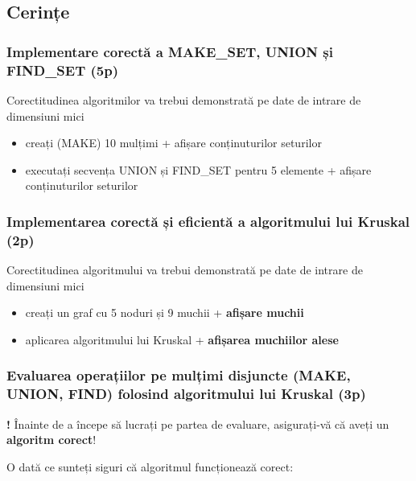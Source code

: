 \documentclass[../ro-fa-lab.tex]{subfiles}
\begin{document}
\subsection{Cerințe}\label{cerinux21be}

\subsubsection{Implementare corectă a MAKE\_SET, UNION și FIND\_SET
(5p)}\label{implementare-corectux103-a-make_set-union-ux219i-find_set-5p}

Corectitudinea algoritmilor va trebui demonstrată pe date de intrare de
dimensiuni mici

\begin{itemize}
\item
  creați (MAKE) 10 mulțimi + afișare conținuturilor seturilor
\item
  executați secvența UNION și FIND\_SET pentru 5 elemente + afișare
  conținuturilor seturilor
\end{itemize}

\subsubsection{Implementarea corectă și eficientă a algoritmului lui
Kruskal
(2p)}\label{implementarea-corectux103-ux219i-eficientux103-a-algoritmului-lui-kruskal-2p}

Corectitudinea algoritmului va trebui demonstrată pe date de intrare de
dimensiuni mici

\begin{itemize}
\item
  creați un graf cu 5 noduri și 9 muchii + \textbf{afișare muchii}
\item
  aplicarea algoritmului lui Kruskal + \textbf{afișarea muchiilor alese}
\end{itemize}

\subsubsection{Evaluarea operațiilor pe mulțimi disjuncte (MAKE, UNION,
FIND) folosind algoritmului lui Kruskal
(3p)}\label{evaluarea-operaux21biilor-pe-mulux21bimi-disjuncte-make-union-find-folosind-algoritmului-lui-kruskal-3p}

\textbf{!} Înainte de a începe să lucrați pe partea de evaluare,
asigurați-vă că aveți un \textbf{algoritm corect}!

O dată ce sunteți siguri că algoritmul funcționează corect:
\end{document}
